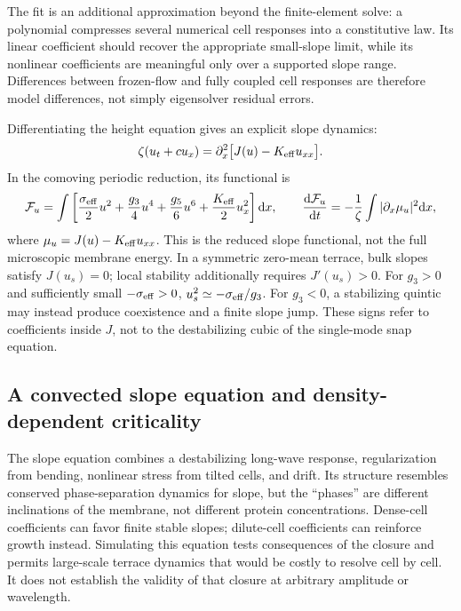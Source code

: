 The fit is an additional approximation beyond the finite-element solve: a polynomial compresses several numerical cell responses into a constitutive law. Its linear coefficient should recover the appropriate small-slope limit, while its nonlinear coefficients are meaningful only over a supported slope range. Differences between frozen-flow and fully coupled cell responses are therefore model differences, not simply eigensolver residual errors.




Differentiating the height equation gives an explicit slope dynamics:
\begin{equation}
\zeta(u_t+cu_x)=\partial_x^2\big[J(u)-K_{\rm eff}u_{xx}\big].
\label{eq:slope-dynamics}
\end{equation}
In the comoving periodic reduction, its functional is
\begin{equation}
\mathcal F_u=\int\left[\frac{\sigma_{\rm eff}}2u^2+\frac{g_3}4u^4
+\frac{g_5}6u^6+\frac{K_{\rm eff}}2u_x^2\right]\mathrm{d} x,
\qquad \frac{\mathrm{d}\mathcal F_u}{\mathrm{d} t}
=-\frac1\zeta\int|\partial_x\mu_u|^2\mathrm{d} x,
\label{eq:slope-functional}
\end{equation}
where $\mu_u=J(u)-K_{\rm eff}u_{xx}$. This is the reduced slope functional, not the full microscopic membrane energy. In a symmetric zero-mean terrace, bulk slopes satisfy $J(u_s)=0$; local stability additionally requires $J'(u_s)>0$. For $g_3>0$ and sufficiently small $-\sigma_{\rm eff}>0$, $u_s^2\simeq-\sigma_{\rm eff}/g_3$. For $g_3<0$, a stabilizing quintic may instead produce coexistence and a finite slope jump. These signs refer to coefficients inside $J$, not to the destabilizing cubic of the single-mode snap equation.

\subsection{A convected slope equation and density-dependent criticality}


The slope equation combines a destabilizing long-wave response, regularization from bending, nonlinear stress from tilted cells, and drift. Its structure resembles conserved phase-separation dynamics for slope, but the ``phases'' are different inclinations of the membrane, not different protein concentrations. Dense-cell coefficients can favor finite stable slopes; dilute-cell coefficients can reinforce growth instead. Simulating this equation tests consequences of the closure and permits large-scale terrace dynamics that would be costly to resolve cell by cell. It does not establish the validity of that closure at arbitrary amplitude or wavelength.


